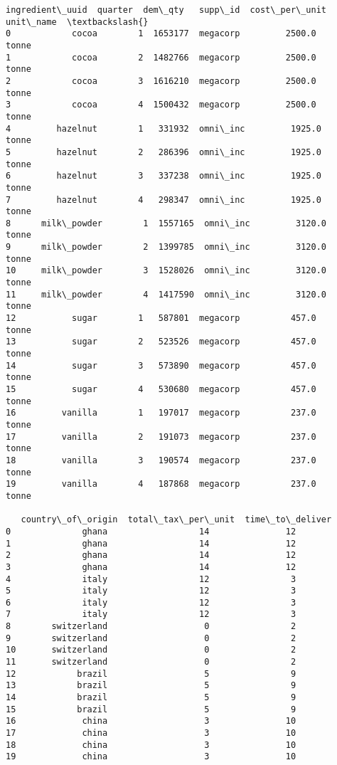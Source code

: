 \documentclass[11pt]{article}
\makeatletter
\newcommand{\boxspacing}{\kern\kvtcb@left@rule\kern\kvtcb@boxsep}
\newcommand{\prompt}[4]{
        {\ttfamily\llap{{\color{#2}[#3]:\hspace{3pt}#4}}\vspace{-\baselineskip}}
    }
\makeatother
\begin{document}
            \begin{tcolorbox}[breakable, size=fbox, boxrule=.5pt, pad at break*=1mm, opacityfill=0]
\prompt{Out}{outcolor}{35}{\boxspacing}
\begin{Verbatim}[commandchars=\\\{\}]
   ingredient\_uuid  quarter  dem\_qty   supp\_id  cost\_per\_unit unit\_name  \textbackslash{}
0            cocoa        1  1653177  megacorp         2500.0     tonne
1            cocoa        2  1482766  megacorp         2500.0     tonne
2            cocoa        3  1616210  megacorp         2500.0     tonne
3            cocoa        4  1500432  megacorp         2500.0     tonne
4         hazelnut        1   331932  omni\_inc         1925.0     tonne
5         hazelnut        2   286396  omni\_inc         1925.0     tonne
6         hazelnut        3   337238  omni\_inc         1925.0     tonne
7         hazelnut        4   298347  omni\_inc         1925.0     tonne
8      milk\_powder        1  1557165  omni\_inc         3120.0     tonne
9      milk\_powder        2  1399785  omni\_inc         3120.0     tonne
10     milk\_powder        3  1528026  omni\_inc         3120.0     tonne
11     milk\_powder        4  1417590  omni\_inc         3120.0     tonne
12           sugar        1   587801  megacorp          457.0     tonne
13           sugar        2   523526  megacorp          457.0     tonne
14           sugar        3   573890  megacorp          457.0     tonne
15           sugar        4   530680  megacorp          457.0     tonne
16         vanilla        1   197017  megacorp          237.0     tonne
17         vanilla        2   191073  megacorp          237.0     tonne
18         vanilla        3   190574  megacorp          237.0     tonne
19         vanilla        4   187868  megacorp          237.0     tonne

   country\_of\_origin  total\_tax\_per\_unit  time\_to\_deliver
0              ghana                  14               12
1              ghana                  14               12
2              ghana                  14               12
3              ghana                  14               12
4              italy                  12                3
5              italy                  12                3
6              italy                  12                3
7              italy                  12                3
8        switzerland                   0                2
9        switzerland                   0                2
10       switzerland                   0                2
11       switzerland                   0                2
12            brazil                   5                9
13            brazil                   5                9
14            brazil                   5                9
15            brazil                   5                9
16             china                   3               10
17             china                   3               10
18             china                   3               10
19             china                   3               10
\end{Verbatim}
\end{tcolorbox}
        
\end{document}
